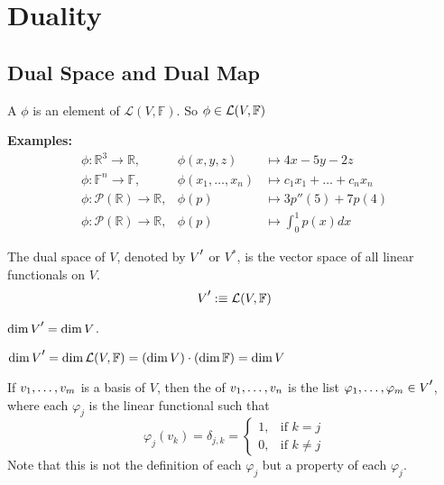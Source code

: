 
\section{Duality}
\subsection{Dual Space and Dual Map}

\setcounter{thm}{107}
\begin{mydef}
  A  $\phi$ is an element of $\mathcal{L}(V, \mathbb{F})$. So $\phi \in \mathcal{L}(V, \mathbb{F})$
\end{mydef}

\textbf{Examples:}
\begin{equation}
  \begin{array}{lll}
    \phi: \mathbb{R}^3  \to \mathbb{R}, &\phi (x,y,z)  & \mapsto 4x-5y-2z \\
    \phi: \mathbb{F}^n  \to \mathbb{F}, &\phi (x_1, \dots, x_n)
    & \mapsto c_1x_1 + \dots + c_nx_n  \\
    \phi: \mathcal{P} (\mathbb{R})  \to \mathbb{R},
    & \phi(p) & \mapsto 3p''(5) + 7p(4) \\
    \phi: \mathcal{P}(\mathbb{R}) \to \mathbb{R},
    & \phi(p)  &\mapsto \textstyle \int_{0}^{1} p(x) dx
  \end{array}
\end{equation}

\setcounter{thm}{109}
\begin{thm}
  The dual space of $V$, denoted by $\dual{V}$ or $V^{*}$, is the vector space of all linear functionals on $V$.
  \begin{equation}
    \dual{V} :\equiv \linmap(V, \myF)
  \end{equation}
\end{thm}

\begin{thm}
  \label{thm: dim V' = dim V}
  $\dim \dual{V} = \dim V$.
\end{thm}
\begin{prf}
  $\dim \dual{V} = \dim \mathcal{L}(V, \mathbb{F})=(\dim V) \cdot (\dim \mathbb{F}) = \dim V $
\end{prf}


\begin{mydef}
  If $v_1, \dots, v_m$ is a basis of $V$, then the  of $v_1, \dots, v_n$ is the list $\varphi_1, \dots, \varphi_m \in \dual{V}$, where each $\varphi_j$ is the linear functional such that
  \begin{equation}
    \varphi_j(v_k) = \delta_{j,k} =
  \begin{cases}
    1,  & \text{if $k=j$} \\
    0, & \text{if $k \neq j$}
  \end{cases}
  \end{equation}
  Note that this is not the definition of each $\varphi_j$ but a property of each $\varphi_j$.
\end{mydef}

